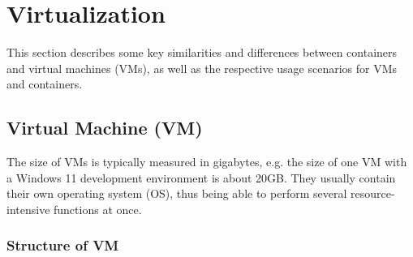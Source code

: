 \section{Virtualization}

This section describes some key similarities and differences between containers and
virtual machines (VMs), as well as the respective usage scenarios for VMs and containers.

\subsection{Virtual Machine (VM)}
The size of VMs is typically measured in gigabytes, e.g. the size of one
VM with a Windows 11 development environment is about 20GB.\cite{b26}
They usually contain their own operating system (OS), thus being able to perform
several resource-intensive functions at once.


\subsubsection{Structure of VM}

